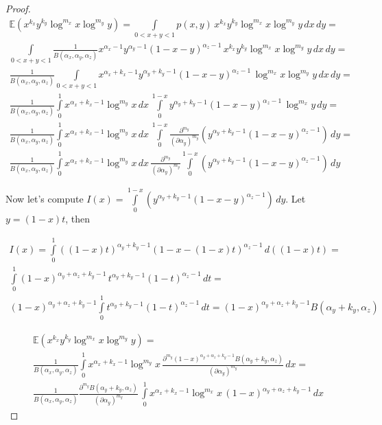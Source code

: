 \documentclass{article}
\begin{document}
\begin{theorem}
\begin{proof}
	\begin{multline*}
	\mathbb{E}(x^{k_x} y^{k_y} \log^{m_x} x \log^{m_y} y) = \int\limits_{0 < x + y < 1} {p(x, y) \, x^{k_x} y^{k_y} \log^{m_x} x \log^{m_y} y \, dx \, dy} = \\ \int\limits_{0 < x + y < 1} {\frac{1}{B(\alpha_x, \alpha_y, \alpha_z)} x^{\alpha_x - 1} y^{\alpha_y - 1} (1 - x - y)^{\alpha_z - 1} \, x^{k_x} y^{k_y} \log^{m_x} x \log^{m_y} y \, dx \, dy} = \\ \frac{1}{B(\alpha_x, \alpha_y, \alpha_z)} \int\limits_{0 < x + y < 1} { x^{\alpha_x + k_x - 1} y^{\alpha_y + k_y - 1} (1 - x - y)^{\alpha_z - 1} \, \log^{m_x} x \log^{m_y} y \, dx \, dy} = \\ \frac{1}{B(\alpha_x, \alpha_y, \alpha_z)} \int\limits_0^1 { x^{\alpha_x + k_x - 1} \log^{m_y}{x} \, dx \, \int\limits_0^{1-x}{ y^{\alpha_y + k_y - 1} (1 - x - y)^{\alpha_z - 1} \, \log^{m_x} y \, dy}} = \\  \frac{1}{B(\alpha_x, \alpha_y, \alpha_z)} \int\limits_0^1 { x^{\alpha_x + k_x - 1} \log^{m_y}{x} \, dx \, \int\limits_0^{1-x}{ \frac{\partial^{m_y}}{(\partial \alpha_y)^{m_y}} (y^{\alpha_y + k_y - 1} (1 - x - y)^{\alpha_z - 1}) \, dy}} = \\ \frac{1}{B(\alpha_x, \alpha_y, \alpha_z)} \int\limits_0^1 { x^{\alpha_x + k_x - 1} \log^{m_y}{x} \, dx \, \frac{\partial^{m_y}}{(\partial \alpha_y)^{m_y}} \int\limits_0^{1-x}{  (y^{\alpha_y + k_y - 1} (1 - x - y)^{\alpha_z - 1}) \, dy}} 
	\end{multline*}
	
	Now let's compute $I(x) = \int\limits_0^{1-x}{  (y^{\alpha_y + k_y - 1} (1 - x - y)^{\alpha_z - 1}) \, dy} $. Let $y = (1 - x)t$, then
	
	\begin{multline*}
	I(x) = \int\limits_0^1{((1 - x)t)^{\alpha_y + k_y - 1} (1 - x - (1 - x)t)^{\alpha_z - 1} \, d((1 - x)t)} = \\ \int\limits_0^1{(1 - x)^{\alpha_y + \alpha_z + k_y - 1} \, t^{\alpha_y + k_y - 1} (1 - t)^{\alpha_z - 1} \, dt} = \\ (1 - x)^{\alpha_y + \alpha_z + k_y - 1} \int\limits_0^1{t^{\alpha_y + k_y - 1} (1 - t)^{\alpha_z - 1} \, dt} = (1 - x)^{\alpha_y + \alpha_z + k_y - 1} B(\alpha_y + k_y, \alpha_z)
	\end{multline*}
	
	\begin{multline*}
	\mathbb{E}(x^{k_x} y^{k_y} \log^{m_x} x \log^{m_y} y) = \\ \frac{1}{B(\alpha_x, \alpha_y, \alpha_z)} \int\limits_0^1 { x^{\alpha_x + k_x - 1} \log^{m_y}{x} \, \frac{\partial^{m_y} (1 - x)^{\alpha_y + \alpha_z + k_y - 1} B(\alpha_y + k_y, \alpha_z)}{(\partial \alpha_y)^{m_y}} \, dx } = \\ \frac{1}{B(\alpha_x, \alpha_y, \alpha_z)} \frac{\partial^{m_y} B(\alpha_y + k_y, \alpha_z)}{(\partial \alpha_y)^{m_y}} \, \int\limits_0^1 { x^{\alpha_x + k_x - 1} \log^{m_x}{x} \, (1 - x)^{\alpha_y + \alpha_z + k_y - 1} \, dx }
	\end{multline*}
	

\end{proof}
\end{theorem}
\end{document}
